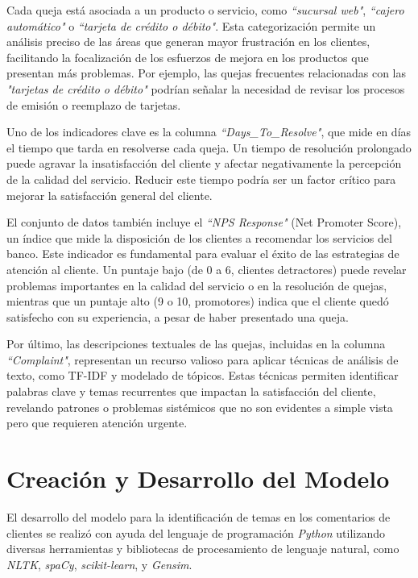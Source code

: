 \documentclass{matematicasud}
\begin{document}
Cada queja está asociada a un producto o servicio, como \textit{``sucursal web"}, \textit{``cajero automático"} o \textit{``tarjeta de crédito o débito"}. Esta categorización permite un análisis preciso de las áreas que generan mayor frustración en los clientes, facilitando la focalización de los esfuerzos de mejora en los productos que presentan más problemas. Por ejemplo, las quejas frecuentes relacionadas con las \textit{"tarjetas de crédito o débito"} podrían señalar la necesidad de revisar los procesos de emisión o reemplazo de tarjetas.

Uno de los indicadores clave es la columna \textit{``Days\_To\_Resolve"}, que mide en días el tiempo que tarda en resolverse cada queja. Un tiempo de resolución prolongado puede agravar la insatisfacción del cliente y afectar negativamente la percepción de la calidad del servicio. Reducir este tiempo podría ser un factor crítico para mejorar la satisfacción general del cliente.

El conjunto de datos también incluye el \textit{``NPS Response"} (Net Promoter Score)\cite{5}, un índice que mide la disposición de los clientes a recomendar los servicios del banco. Este indicador es fundamental para evaluar el éxito de las estrategias de atención al cliente. Un puntaje bajo (de 0 a 6, clientes detractores) puede revelar problemas importantes en la calidad del servicio o en la resolución de quejas, mientras que un puntaje alto (9 o 10, promotores) indica que el cliente quedó satisfecho con su experiencia, a pesar de haber presentado una queja.

Por último, las descripciones textuales de las quejas, incluidas en la columna \textit{``Complaint"}, representan un recurso valioso para aplicar técnicas de análisis de texto, como TF-IDF y modelado de tópicos. Estas técnicas permiten identificar palabras clave y temas recurrentes que impactan la satisfacción del cliente, revelando patrones o problemas sistémicos que no son evidentes a simple vista pero que requieren atención urgente.


\newpage
\section{Creación y Desarrollo del Modelo}

El desarrollo del modelo para la identificación de temas en los comentarios de clientes se realizó con ayuda del lenguaje de programación \textit{Python} utilizando diversas herramientas y bibliotecas de procesamiento de lenguaje natural, como \textit{NLTK}, \textit{spaCy}, \textit{scikit-learn}, y \textit{Gensim}.
\end{document}
